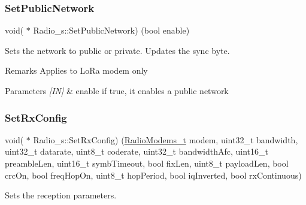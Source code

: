 \subsubsection{\texorpdfstring{Set\+Public\+Network}{SetPublicNetwork}}
{\footnotesize\ttfamily void( $\ast$ Radio\+\_\+s\+::\+Set\+Public\+Network) (bool enable)}



Sets the network to public or private. Updates the sync byte. 

\begin{DoxyRemark}{Remarks}
Applies to Lo\+Ra modem only
\end{DoxyRemark}

\begin{DoxyParams}{Parameters}
{\em \mbox{[}\+I\+N\mbox{]}} & enable if true, it enables a public network \\
\hline
\end{DoxyParams}
\mbox{\label{group__LORA_gadd564d2a79027afbc6f0f8f3011fe93b}} 
\subsubsection{\texorpdfstring{Set\+Rx\+Config}{SetRxConfig}}
{\footnotesize\ttfamily void( $\ast$ Radio\+\_\+s\+::\+Set\+Rx\+Config) (\hyperlink{group__LORA_ga992ef7a5b7f52975ba7bd8dd97740057}{Radio\+Modems\+\_\+t} modem, uint32\+\_\+t bandwidth, uint32\+\_\+t datarate, uint8\+\_\+t coderate, uint32\+\_\+t bandwidth\+Afc, uint16\+\_\+t preamble\+Len, uint16\+\_\+t symb\+Timeout, bool fix\+Len, uint8\+\_\+t payload\+Len, bool crc\+On, bool freq\+Hop\+On, uint8\+\_\+t hop\+Period, bool iq\+Inverted, bool rx\+Continuous)}



Sets the reception parameters. 


